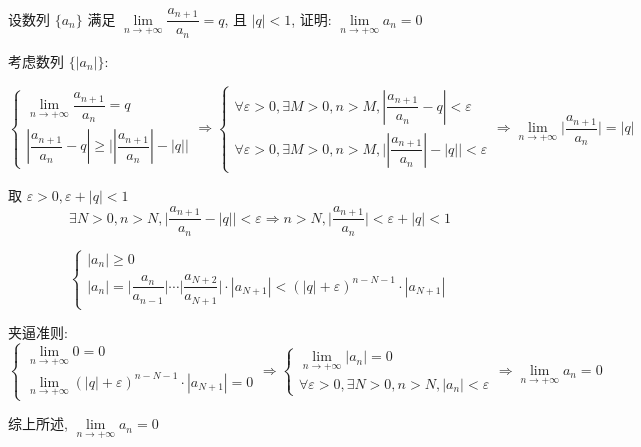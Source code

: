 \begin{proposition}
	设数列 $\{a_{n}\}$ 满足 $\lim\limits_{n\to+\infty}\dfrac{a_{n+1}}{a_{n}}=q$, 且 $|q|<1$, 证明: $\lim\limits_{n\to+\infty}a_{n}=0$
\end{proposition}
\begin{solution}
	
	考虑数列 $\{|a_{n}|\}$:

	$$\begin{cases}
		\lim\limits_{n\to+\infty}\dfrac{a_{n+1}}{a_{n}} = q\\
		|\dfrac{a_{n+1}}{a_{n}}-q| \geq \big||\dfrac{a_{n+1}}{a_{n}}|-|q|\big| 
	\end{cases}\Rightarrow
	\begin{cases}
		\forall \varepsilon > 0, \exists M > 0, n > M, |\dfrac{a_{n+1}}{a_{n}}-q| < \varepsilon \\
		\forall \varepsilon > 0, \exists M > 0, n > M, \big||\dfrac{a_{n+1}}{a_{n}}|-|q|\big| < \varepsilon
	\end{cases}
	\Rightarrow \lim\limits_{n\to+\infty}\big|\dfrac{a_{n+1}}{a_{n}}\big| = |q|$$
	
	取 $\varepsilon > 0 ,\varepsilon + |q| < 1$
	$$\exists N > 0, n > N, \big|\dfrac{a_{n+1}}{a_{n}}-|q|\big| < \varepsilon \Rightarrow n > N, \big| \dfrac{a_{n+1}}{a_{n}}\big| < \varepsilon + |q| < 1$$
	
	$$\begin{cases}
		|a_{n}| \geq 0\\
		|a_{n}| = \big|\dfrac{a_{n}}{a_{n-1}}\big|\cdots\big|\dfrac{a_{N+2}}{a_{N+1}}\big|\cdot|a_{N+1}| <  (|q|+\varepsilon)^{n-N-1}\cdot |a_{N+1}|
	\end{cases}$$

	夹逼准则:
	$$
	\begin{cases} 
		\lim\limits_{n\to +\infty} 0 = 0\\
		\lim\limits_{n\to +\infty} (|q|+\varepsilon)^{n-N-1}\cdot |a_{N+1}| = 0
	\end{cases}\Rightarrow
	\begin{cases}
		\lim\limits_{n\to +\infty} |a_{n}| = 0\\
		\forall \varepsilon > 0, \exists N > 0, n > N, |a_{n}| < \varepsilon
	\end{cases}
	\Rightarrow \lim\limits_{n\to +\infty} a_{n} = 0 
	$$
	
	综上所述, $\lim\limits_{n\to+\infty}a_{n}=0$
\end{solution}

